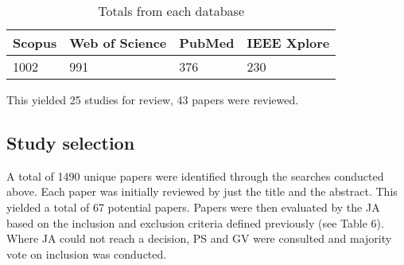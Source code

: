 \documentclass[12pt]{article}
\begin{document}
\begin{table}
	\begin{tabular}{ p{3cm} | p{3cm} | p{3cm} | p{3cm} }
	\hline
	Scopus & Web of Science & PubMed & IEEE Xplore \\ \hline
	1002 & 991 & 376 & 230 \\ 
	\hline
	\end{tabular}
	\caption[Table caption text]{Totals from each database}
	\label{table:name}
\end{table}

This yielded 25 studies for review, 43 papers were reviewed.

\subsection{Study selection}
A total of 1490 unique papers were identified through the searches conducted above.  Each paper was initially reviewed by just the title and the abstract. This yielded a total of 67 potential papers. Papers were then evaluated by the JA based on the inclusion and exclusion criteria defined previously (see Table 6). Where JA could not reach a decision, PS and GV were consulted and majority vote on inclusion was conducted.
\end{document}
